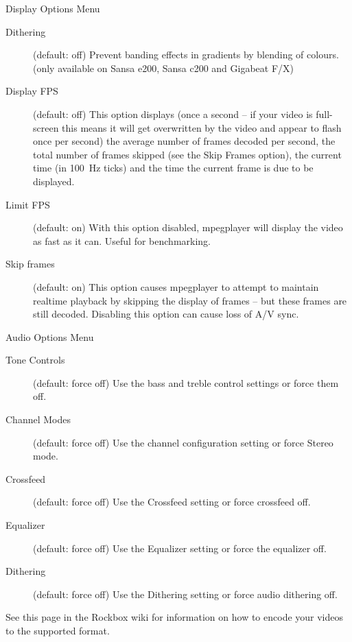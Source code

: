 Display Options Menu

\begin{description}
\item[Dithering] (default: off) Prevent banding effects in gradients by blending
    of colours. (only available on Sansa e200, Sansa c200 and Gigabeat F/X)
\item[Display FPS] (default: off) This option displays (once a second -- if your
    video is full-screen this means it will get overwritten by the video and
    appear to flash once per second) the average number of frames decoded per
    second, the total number of frames skipped (see the Skip Frames option),
    the current time (in 100~Hz ticks) and the time the current frame is due to
    be displayed.
\item[Limit FPS] (default: on) With this option disabled, mpegplayer will
    display the video as fast as it can. Useful for benchmarking.
\item[Skip frames] (default: on) This option causes mpegplayer to attempt to
    maintain realtime playback by skipping the display of frames -- but these
    frames are still decoded. Disabling this option can cause loss of A/V sync.
\end{description}

Audio Options Menu

\begin{description}
\item[Tone Controls] (default: force off) Use the bass and treble control
    settings or force them off.
\item[Channel Modes] (default: force off) Use the channel configuration setting
    or force Stereo mode.
\item[Crossfeed] (default: force off) Use the Crossfeed setting or force
    crossfeed off.
\item[Equalizer] (default: force off) Use the Equalizer setting or force the
    equalizer off.
\item[Dithering] (default: force off) Use the Dithering setting or force
    audio dithering off.
\end{description}

See this page in the Rockbox wiki for information on how to encode your videos
to the supported format. 
